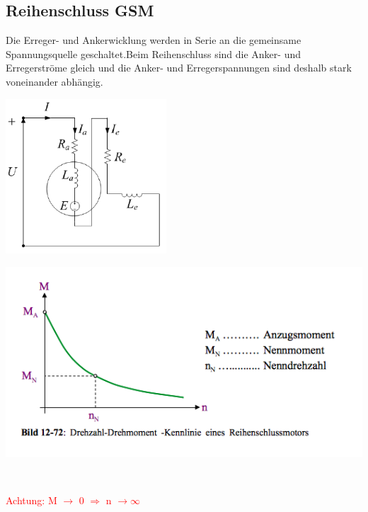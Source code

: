 \subsection{Reihenschluss GSM}
    Die Erreger- und Ankerwicklung werden in Serie an die gemeinsame Spannungsquelle geschaltet.\newline Beim Reihenschluss sind die Anker- und Erregerströme gleich und die Anker- und Erregerspannungen sind deshalb \newline stark voneinander abhängig.\newline
    \begin{minipage}[b]{0.4\textwidth}
    	\raggedright
    	\includegraphics[width=6cm]{images/Reihenschluss.png}
    \end{minipage}
    \begin{minipage}[b]{0.5\textwidth}
    	\raggedright
    	\includegraphics[scale = 0.6]{images/KennlinieReihenschluss}
    \end{minipage}\\
    \begin{minipage}[b]{0.7\linewidth}
        \raggedleft
        \textcolor{red}{Achtung: M $\rightarrow$ 0 $\Rightarrow$ n $\rightarrow \infty$}
    \end{minipage}
    \\
    
